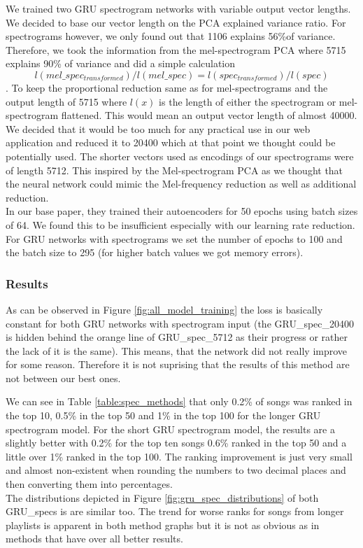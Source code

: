 We trained two GRU spectrogram networks with variable output vector lengths. We decided to base our vector length on the PCA explained variance ratio. For spectrograms however, we only found out that 1106 explains 56\%of variance. Therefore, we took the information from the mel-spectrogram PCA where 5715 explains 90\% of variance and did a simple calculation $$ l(mel\_spec_{transformed})/l(mel\_spec) = l(spec_{transformed})/l(spec) $$. To keep the proportional reduction same as for mel-spectrograms and the output length of 5715 where $l(x)$ is the length of either the spectrogram or mel-spectrogram flattened. This would mean an output vector length of almost 40000. We decided that it would be too much for any practical use in our web application and reduced it to 20400 which at that point we thought could be potentially used. The shorter vectors used as encodings of our spectrograms were of length 5712. This inspired by the Mel-spectrogram PCA as we thought that the neural network could mimic the Mel-frequency reduction as well as additional reduction. \\
In our base paper, they trained their autoencoders for 50 epochs using batch sizes of 64. We found this to be insufficient especially with our learning rate reduction. For GRU networks with spectrograms we set the number of epochs to 100 and the batch size to 295 (for higher batch values we got memory errors). 

\subsubsection{Results}
As can be observed in Figure \ref{fig:all_model_training} the loss is basically constant for both GRU networks with spectrogram input (the GRU\_spec\_20400 is hidden behind the orange line of GRU\_spec\_5712 as their progress or rather the lack of it is the same). This means, that the network did not really improve for some reason. Therefore it is not suprising that the results of this method are not between our best ones.

We can see in Table \ref{table:spec_methods} that only 0.2\% of songs was ranked in the top 10, 0.5\% in the top 50 and 1\% in the top 100 for the longer GRU spectrogram model. For the short GRU spectrogram model, the results are a slightly better with 0.2\% for the top ten songs 0.6\% ranked in the top 50 and a little over 1\% ranked in the top 100. The ranking improvement is just very small and almost non-existent when rounding the numbers to two decimal places and then converting them into percentages. \\
The distributions depicted in Figure \ref{fig:gru_spec_distributions} of both GRU\_specs is are similar too. The trend for worse ranks for songs from longer playlists is apparent in both method graphs but it is not as obvious as in methods that have over all better results.

